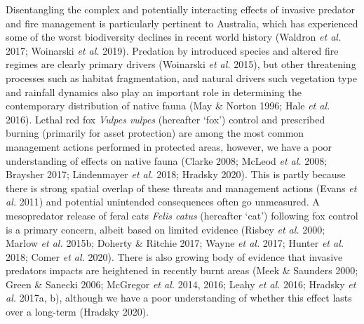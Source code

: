 \documentclass[11pt,a4paper,titlepage,twoside,openright]{style/unimelbthesis}
\begin{document}
\begin{mainmatter}
Disentangling the complex and potentially interacting effects of invasive predator and fire management is particularly pertinent to Australia, which has experienced some of the worst biodiversity declines in recent world history (Waldron \emph{et al.} 2017; Woinarski \emph{et al.} 2019). Predation by introduced species and altered fire regimes are clearly primary drivers (Woinarski \emph{et al.} 2015), but other threatening processes such as habitat fragmentation, and natural drivers such vegetation type and rainfall dynamics also play an important role in determining the contemporary distribution of native fauna (May \& Norton 1996; Hale \emph{et al.} 2016). Lethal red fox \emph{Vulpes vulpes} (hereafter `fox') control and prescribed burning (primarily for asset protection) are among the most common management actions performed in protected areas, however, we have a poor understanding of effects on native fauna (Clarke 2008; McLeod \emph{et al.} 2008; Braysher 2017; Lindenmayer \emph{et al.} 2018; Hradsky 2020). This is partly because there is strong spatial overlap of these threats and management actions (Evans \emph{et al.} 2011) and potential unintended consequences often go unmeasured. A mesopredator release of feral cats \emph{Felis catus} (hereafter `cat') following fox control is a primary concern, albeit based on limited evidence (Risbey \emph{et al.} 2000; Marlow \emph{et al.} 2015b; Doherty \& Ritchie 2017; Wayne \emph{et al.} 2017; Hunter \emph{et al.} 2018; Comer \emph{et al.} 2020). There is also growing body of evidence that invasive predators impacts are heightened in recently burnt areas (Meek \& Saunders 2000; Green \& Sanecki 2006; McGregor \emph{et al.} 2014, 2016; Leahy \emph{et al.} 2016; Hradsky \emph{et al.} 2017a, b), although we have a poor understanding of whether this effect lasts over a long-term (Hradsky 2020).


\end{mainmatter}
\end{document}

